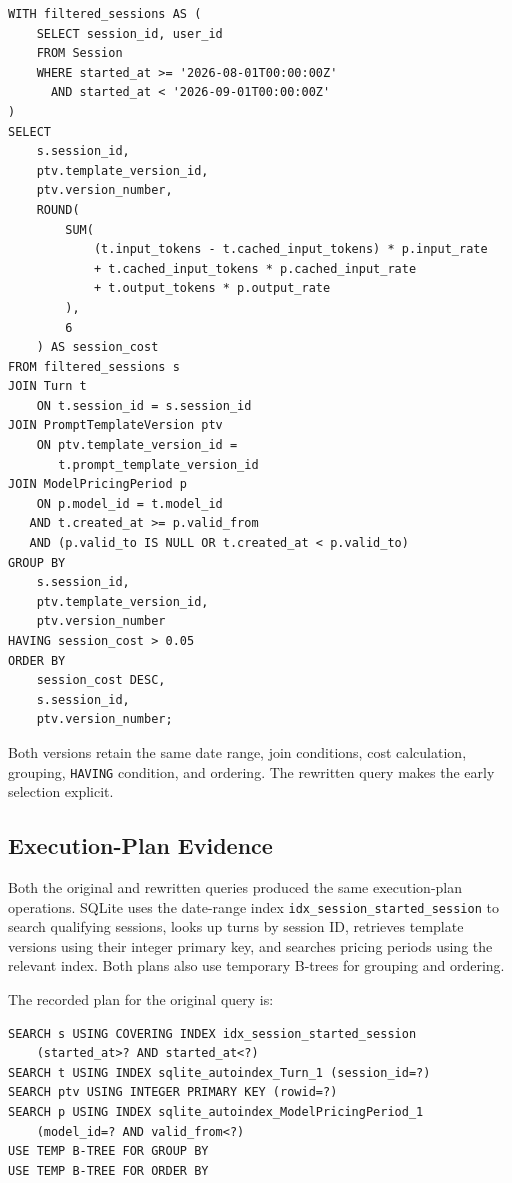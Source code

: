 \documentclass[11pt,a4paper]{article}
\begin{document}
\begin{lstlisting}[style=sqlstyle]
WITH filtered_sessions AS (
    SELECT session_id, user_id
    FROM Session
    WHERE started_at >= '2026-08-01T00:00:00Z'
      AND started_at < '2026-09-01T00:00:00Z'
)
SELECT
    s.session_id,
    ptv.template_version_id,
    ptv.version_number,
    ROUND(
        SUM(
            (t.input_tokens - t.cached_input_tokens) * p.input_rate
            + t.cached_input_tokens * p.cached_input_rate
            + t.output_tokens * p.output_rate
        ),
        6
    ) AS session_cost
FROM filtered_sessions s
JOIN Turn t
    ON t.session_id = s.session_id
JOIN PromptTemplateVersion ptv
    ON ptv.template_version_id =
       t.prompt_template_version_id
JOIN ModelPricingPeriod p
    ON p.model_id = t.model_id
   AND t.created_at >= p.valid_from
   AND (p.valid_to IS NULL OR t.created_at < p.valid_to)
GROUP BY
    s.session_id,
    ptv.template_version_id,
    ptv.version_number
HAVING session_cost > 0.05
ORDER BY
    session_cost DESC,
    s.session_id,
    ptv.version_number;
\end{lstlisting}

Both versions retain the same date range, join conditions, cost
calculation, grouping, \texttt{HAVING} condition, and ordering.
The rewritten query makes the early selection explicit.

\subsection{Execution-Plan Evidence}

Both the original and rewritten queries produced the same
execution-plan operations. SQLite uses the date-range index
\texttt{idx\_session\_started\_session} to search qualifying
sessions, looks up turns by session ID, retrieves template
versions using their integer primary key, and searches pricing
periods using the relevant index. Both plans also use temporary
B-trees for grouping and ordering.

The recorded plan for the original query is:

\begin{lstlisting}[style=textstyle]
SEARCH s USING COVERING INDEX idx_session_started_session
    (started_at>? AND started_at<?)
SEARCH t USING INDEX sqlite_autoindex_Turn_1 (session_id=?)
SEARCH ptv USING INTEGER PRIMARY KEY (rowid=?)
SEARCH p USING INDEX sqlite_autoindex_ModelPricingPeriod_1
    (model_id=? AND valid_from<?)
USE TEMP B-TREE FOR GROUP BY
USE TEMP B-TREE FOR ORDER BY
\end{lstlisting}
\end{document}
